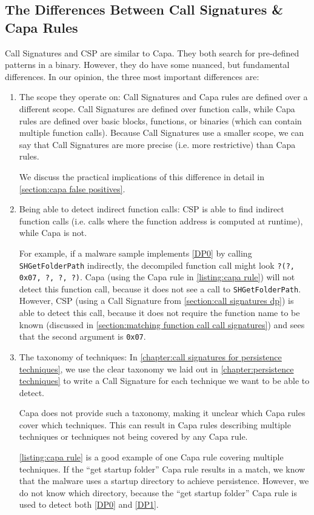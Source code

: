 \subsection{The Differences Between Call Signatures \& Capa Rules}\label{section:differences call signatures and capa rules}
Call Signatures and CSP are similar to Capa. They both search for pre-defined patterns in a binary. However, they do have some nuanced, but fundamental differences. In our opinion, the three most important differences are:

\begin{enumerate}
  \item The scope they operate on: Call Signatures and Capa rules are defined over a different scope. Call Signatures are defined over function calls, while Capa rules are defined over basic blocks, functions, or binaries (which can contain multiple function calls). Because Call Signatures use a smaller scope, we can say that Call Signatures are more precise (i.e. more restrictive) than Capa rules.

  We discuss the practical implications of this difference in detail in \autoref{section:capa false positives}.

  \item Being able to detect indirect function calls: CSP is able to find indirect function calls (i.e. calls where the function address is computed at runtime), while Capa is not.

  For example, if a malware sample implements \autoref{DP0} by calling \texttt{SHGetFolderPath} indirectly, the decompiled function call might look \texttt{?(?, 0x07, ?, ?, ?)}. Capa (using the Capa rule in \autoref{listing:capa rule}) will not detect this function call, because it does not see a call to \texttt{SHGetFolderPath}. However, CSP (using a Call Signature from \autoref{section:call signatures dp}) is able to detect this call, because it does not require the function name to be known (discussed in \autoref{section:matching function call call signatures}) and sees that the second argument is \texttt{0x07}.

  \item The taxonomy of techniques: In \autoref{chapter:call signatures for persistence techniques}, we use the clear taxonomy we laid out in \autoref{chapter:persistence techniques} to write a Call Signature for each technique we want to be able to detect.

  Capa does not provide such a taxonomy, making it unclear which Capa rules cover which techniques. This can result in Capa rules describing multiple techniques or techniques not being covered by any Capa rule.

  \autoref{listing:capa rule} is a good example of one Capa rule covering multiple techniques. If the ``get startup folder'' Capa rule results in a match, we know that the malware uses a startup directory to achieve persistence. However, we do not know which directory, because the ``get startup folder'' Capa rule is used to detect both \autoref{DP0} and \autoref{DP1}.
\end{enumerate}
